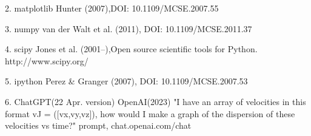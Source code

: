 \documentclass[linenumbers,trackchanges,twocolumn]{aastex7}
\begin{document}
2. matplotlib Hunter (2007),DOI: 10.1109/MCSE.2007.55

3. numpy van der Walt et al. (2011), DOI: 10.1109/MCSE.2011.37

4. scipy Jones et al. (2001–),Open source scientific tools for Python. http://www.scipy.org/

5. ipython Perez \& Granger (2007), DOI: 10.1109/MCSE.2007.53

6. ChatGPT(22 Apr. version) OpenAI(2023) "I have an array of velocities in this format vJ = ([vx,vy,vz]), how would I make a graph of the dispersion of these velocities vs time?" prompt, chat.openai.com/chat



\newpage
{}

\end{document}
